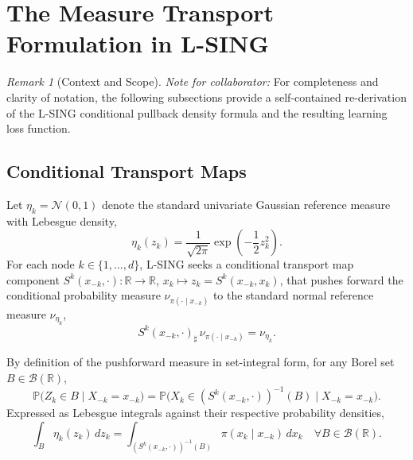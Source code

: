\documentclass[11pt,a4paper]{article}
\theoremstyle{plain}
\theoremstyle{definition}
\theoremstyle{remark}
\newtheorem{remark}[theorem]{Remark}
\begin{document}
\section{The Measure Transport Formulation in L-SING}

\begin{remark}[Context and Scope]
\textit{Note for collaborator:} For completeness and clarity of notation, the following subsections provide a self-contained re-derivation of the L-SING conditional pullback density formula and the resulting learning loss function. 
\end{remark}

\subsection{Conditional Transport Maps}

Let $\eta_k = \mathcal{N}(0, 1)$ denote the standard univariate Gaussian reference measure with Lebesgue density,
\begin{equation}
    \eta_k(z_k) = \frac{1}{\sqrt{2\pi}} \exp\left(-\frac{1}{2} z_k^2\right).
\end{equation}
For each node $k \in \{1, \dots, d\}$, L-SING seeks a conditional transport map component $S^k(x_{-k}, \cdot): \mathbb{R} \to \mathbb{R}$, $x_k \mapsto z_k = S^k(x_{-k}, x_k)$, that pushes forward the conditional probability measure $\nu_{\pi(\cdot \mid x_{-k})}$ to the standard normal reference measure $\nu_{\eta_k}$,
\begin{equation}
    S^k(x_{-k}, \cdot)_\sharp \, \nu_{\pi(\cdot \mid x_{-k})} = \nu_{\eta_k}.
    \label{eq:pushforward_measure_statement}
\end{equation}

By definition of the pushforward measure in set-integral form, for any Borel set $B \in \mathcal{B}(\mathbb{R})$,
\begin{equation}
    \mathbb{P}\Big( Z_k \in B \;\Big|\; X_{-k} = x_{-k} \Big) = \mathbb{P}\Big( X_k \in (S^k(x_{-k}, \cdot))^{-1}(B) \;\Big|\; X_{-k} = x_{-k} \Big).
\end{equation}
Expressed as Lebesgue integrals against their respective probability densities,
\begin{equation}
    \int_B \eta_k(z_k) \, dz_k = \int_{(S^k(x_{-k}, \cdot))^{-1}(B)} \pi(x_k \mid x_{-k}) \, dx_k \quad \forall B \in \mathcal{B}(\mathbb{R}).
    \label{eq:integral_equality_fundamental}
\end{equation}
\end{document}
